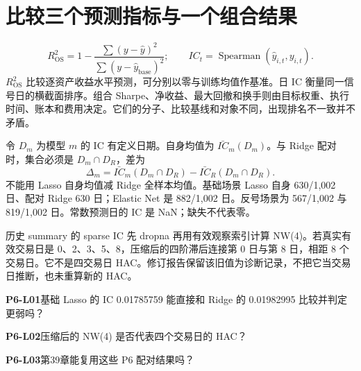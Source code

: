 \clearpage\section{比较三个预测指标与一个组合结果}
\begin{definition}[四类结果]
\[
R^2_{\mathrm{OS}}=1-\frac{\sum (y-\hat y)^2}{\sum (y-\hat y_{\mathrm{base}})^2};
\qquad
IC_t=\operatorname{Spearman}(\hat y_{i,t},y_{i,t}).
\]
\(R^2_{\mathrm{OS}}\) 比较逐资产收益水平预测，可分别以零与训练均值作基准。日 IC 衡量同一信号日的横截面排序。组合 Sharpe、净收益、最大回撤和换手则由目标权重、执行时间、账本和费用决定。它们的分子、比较基线和对象不同，出现排名不一致并不矛盾。
\end{definition}
令 \(D_m\) 为模型 \(m\) 的 IC 有定义日期。自身均值为 \(\bar{IC}_m(D_m)\)。与 Ridge 配对时，集合必须是 \(D_m\cap D_R\)，差为
\[
\Delta_m=\bar{IC}_m(D_m\cap D_R)-\bar{IC}_R(D_m\cap D_R).
\]
不能用 Lasso 自身均值减 Ridge 全样本均值。基础场景 Lasso 自身 630/1,002 日、配对 Ridge 630 日；Elastic Net 是 882/1,002 日。反号场景为 567/1,002 与 819/1,002 日。常数预测日的 IC 是 NaN；缺失不代表零。

历史 summary 的 sparse IC 先 dropna 再用有效观察索引计算 NW(4)。若真实有效交易日是 0、2、3、5、8，压缩后的四阶滞后连接第 0 日与第 8 日，相距 8 个交易日。它不是四交易日 HAC。修订报告保留该旧值为诊断记录，不把它当交易日推断，也未重算新的 HAC。

\begin{yourturn}\textbf{P6-L01}\quad 基础 Lasso 的 IC 0.01785759 能直接和 Ridge 的 0.01982995 比较并判定更弱吗？\workspace[3]\end{yourturn}
\begin{yourturn}\textbf{P6-L02}\quad 压缩后的 NW(4) 是否代表四个交易日的 HAC？\workspace[3]\end{yourturn}
\begin{yourturn}\textbf{P6-L03}\quad 第39章能复用这些 P6 配对结果吗？\workspace[3]\end{yourturn}

